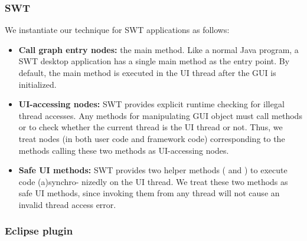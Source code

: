 \subsubsection{SWT}

 We instantiate our technique for SWT applications as follows:


\begin{itemize}

\item \textbf{Call graph entry nodes: } the main method. Like a normal Java program,
a SWT desktop application has a single main method as the entry point. By default,
the main method is executed in the UI thread after the GUI
is initialized.

\item \textbf{UI-accessing nodes: } SWT provides explicit
runtime checking for illegal thread accesses. Any methods for manipulating
GUI object must call methods 
or  to check whether the current
thread is the UI thread or not.
Thus, we treat nodes (in both user code and framework code) corresponding to the methods
calling these two methods as UI-accessing nodes.

\item \textbf{Safe UI methods: } SWT provides two helper methods (
and ) to execute code (a)synchro-
nizedly on the UI thread.
 We treat these two methods as safe UI methods, since invoking
them from any thread 
will not cause an invalid thread access error.

\end{itemize}

\subsubsection{Eclipse plugin}


